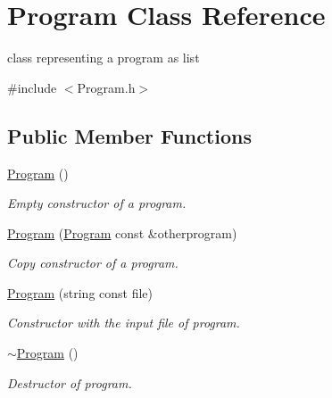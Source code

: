 \hypertarget{class_program}{}\section{Program Class Reference}
\label{class_program}


class representing a program as list  




{\ttfamily \#include $<$Program.\+h$>$}

\subsection*{Public Member Functions}
\begin{DoxyCompactItemize}
\item 
\mbox{\label{class_program_aaefaa0df08f3484476fc4d61e97acbdc}} 
\mbox{\hyperlink{class_program_aaefaa0df08f3484476fc4d61e97acbdc}{Program}} ()
\begin{DoxyCompactList}\small\item\em Empty constructor of a program. \end{DoxyCompactList}\item 
\mbox{\label{class_program_a9918fe797bf830c47a652c81f449c35c}} 
\mbox{\hyperlink{class_program_a9918fe797bf830c47a652c81f449c35c}{Program}} (\mbox{\hyperlink{class_program}{Program}} const \&otherprogram)
\begin{DoxyCompactList}\small\item\em Copy constructor of a program. \end{DoxyCompactList}\item 
\mbox{\label{class_program_aabe3dfc72075de14b189b22b0e33ff23}} 
\mbox{\hyperlink{class_program_aabe3dfc72075de14b189b22b0e33ff23}{Program}} (string const file)
\begin{DoxyCompactList}\small\item\em Constructor with the input file of program. \end{DoxyCompactList}\item 
\mbox{\label{class_program_a986aef1c50e1d338a3315a47ba6df549}} 
\mbox{\hyperlink{class_program_a986aef1c50e1d338a3315a47ba6df549}{$\sim$\+Program}} ()
\begin{DoxyCompactList}\small\item\em Destructor of program. \end{DoxyCompactList}\item 

\end{DoxyCompactItemize}
